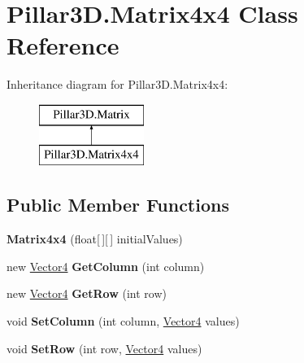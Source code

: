 \hypertarget{class_pillar3_d_1_1_matrix4x4}{}\section{Pillar3\+D.\+Matrix4x4 Class Reference}
\label{class_pillar3_d_1_1_matrix4x4}
Inheritance diagram for Pillar3\+D.\+Matrix4x4\+:\begin{figure}[H]
\begin{center}
\leavevmode
\includegraphics[height=2.000000cm]{class_pillar3_d_1_1_matrix4x4}
\end{center}
\end{figure}
\subsection*{Public Member Functions}
\begin{DoxyCompactItemize}
\item 
\mbox{\label{class_pillar3_d_1_1_matrix4x4_ad8b3622dedb3f9932abdf9d47d51de82}} 
{\bfseries Matrix4x4} (float\mbox{[}$\,$\mbox{]}\mbox{[}$\,$\mbox{]} initial\+Values)
\item 
\mbox{\label{class_pillar3_d_1_1_matrix4x4_a39c8563032213a6f5e77a09eef68d04b}} 
new \hyperlink{class_pillar3_d_1_1_vector4}{Vector4} {\bfseries Get\+Column} (int column)
\item 
\mbox{\label{class_pillar3_d_1_1_matrix4x4_a3eb437ba9b70c86161c68e71f7bd95f2}} 
new \hyperlink{class_pillar3_d_1_1_vector4}{Vector4} {\bfseries Get\+Row} (int row)
\item 
\mbox{\label{class_pillar3_d_1_1_matrix4x4_a81e5dcd34344bb209183ffba3f856c8d}} 
void {\bfseries Set\+Column} (int column, \hyperlink{class_pillar3_d_1_1_vector4}{Vector4} values)
\item 
\mbox{\label{class_pillar3_d_1_1_matrix4x4_ac2b8f2fb4979b96059f0869f4c86ff39}} 
void {\bfseries Set\+Row} (int row, \hyperlink{class_pillar3_d_1_1_vector4}{Vector4} values)
\end{DoxyCompactItemize}
